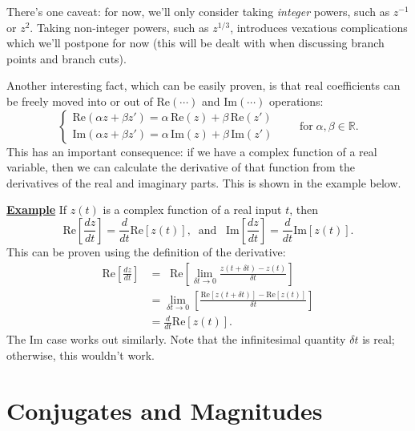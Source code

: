 \documentclass[10pt,a4paper]{article}
\begin{document}
There's one caveat: for now, we'll only consider taking \emph{integer}
powers, such as $z^{-1}$ or $z^2$. Taking non-integer powers, such as
$z^{1/3}$, introduces vexatious complications which we'll postpone for
now (this will be dealt with when discussing branch points and branch
cuts).

Another interesting fact, which can be easily proven, is that real
coefficients can be freely moved into or out of $\textrm{Re}(\cdots)$
and $\textrm{Im}(\cdots)$ operations:
\begin{equation}
\left\{\begin{array}{l}\mathrm{Re}(\alpha z + \beta z') = \alpha \, \mathrm{Re}(z) + \beta\, \mathrm{Re}(z')\\ \mathrm{Im}(\alpha z + \beta z') = \alpha \, \mathrm{Im}(z) + \beta\, \mathrm{Im}(z')\end{array}\right.\qquad\mathrm{for}\;\alpha, \beta \in \mathbb{R}.
\end{equation}
This has an important consequence: if we have a complex function of a
real variable, then we can calculate the derivative of that function
from the derivatives of the real and imaginary parts.  This is shown
in the example below.

\begin{framed}
\noindent
\underline{\textbf{Example}}
\vskip 0.1in \noindent
If $z(t)$ is a complex function of a real input $t$, then
\begin{equation}
  \mathrm{Re}\left[\frac{dz}{dt}\right] = \frac{d}{dt} \mathrm{Re}\left[z(t)\right], \;\;\textrm{and}\;\;\; \mathrm{Im}\left[\frac{dz}{dt}\right] = \frac{d}{dt} \mathrm{Im}\left[z(t)\right].
\end{equation}
This can be proven using the definition of the derivative:
\begin{align*}
  \mathrm{Re}\left[\frac{dz}{dt}\right] &= \;\; \mathrm{Re}\left[\lim_{\delta t \rightarrow 0} \frac{z(t+\delta t) - z(t)}{\delta t}\right] \\
  &= \lim_{\delta t \rightarrow 0} \left[\frac{\mathrm{Re}[z(t+\delta t)] - \mathrm{Re}[z(t)]}{\delta t}\right] \\
  &= \frac{d}{dt} \mathrm{Re}\left[z(t)\right].
\end{align*}
The $\mathrm{Im}$ case works out similarly. Note that the
infinitesimal quantity $\delta t$ is real; otherwise, this wouldn't
work.
\end{framed}

\section{Conjugates and Magnitudes}\label{magnitudes-and-conjugates}
\end{document}
